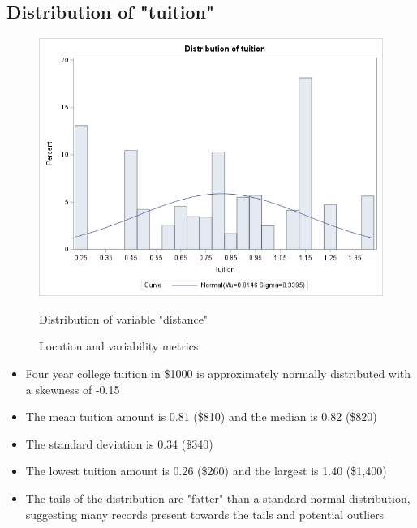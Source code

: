 \documentclass[12pt]{article}
\begin{document}
\subsection{Distribution of "tuition"}
\begin{figure}[h]
    \centering
    \begin{minipage}[t]{0.65\textwidth}
        \vspace{0pt}
        \centering
        \includegraphics[width=\textwidth]{images/tuition_hist.png}
        \caption{Distribution of variable "distance"}
        \label{fig:tuition_dist}
    \end{minipage}\hfill
    \begin{minipage}[t]{0.3\textwidth}
        \vspace{15pt}
        \centering
        
        \caption{Location and variability metrics}
        \label{fig:tuition_measures}
    \end{minipage}
    \label{fig:tuition_fig}
\end{figure}
\newpage

\begin{itemize}
    \item Four year college tuition in \$1000 is approximately normally distributed with a skewness of -0.15
    \item The mean tuition amount is 0.81 (\$810) and the median is 0.82 (\$820)
    \item The standard deviation is 0.34 (\$340)
    \item The lowest tuition amount is 0.26 (\$260) and the largest is 1.40 (\$1,400)
    \item The tails of the distribution are "fatter" than a standard normal distribution, suggesting many records present towards the tails and potential outliers
\end{itemize}
\newpage
\end{document}
